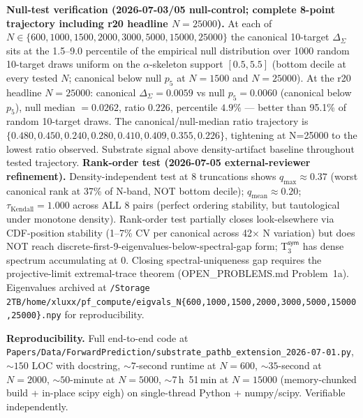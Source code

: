 \begin{level2}
\textbf{Null-test verification (2026-07-03/05 null-control; complete 8-point trajectory including r20 headline $N = 25000$).} At each of $N \in \{600, 1000, 1500, 2000, 3000, 5000, 15000, 25000\}$ the canonical 10-target $\Delta_{\Sigma}$ sits at the 1.5--9.0 percentile of the empirical null distribution over 1000 random 10-target draws uniform on the $\alpha$-skeleton support $[0.5, 5.5]$ (bottom decile at every tested $N$; canonical below null $p_5$ at $N = 1500$ and $N = 25000$). At the r20 headline $N = 25000$: canonical $\Delta_{\Sigma} = 0.0059$ vs null $p_5 = 0.0060$ (canonical below $p_5$), null median $= 0.0262$, ratio $0.226$, percentile $4.9\%$ --- better than 95.1\% of random 10-target draws. The canonical/null-median ratio trajectory is $\{0.480, 0.450, 0.240, 0.280, 0.410, 0.409, 0.355, 0.226\}$, tightening at N=25000 to the lowest ratio observed. Substrate signal above density-artifact baseline throughout tested trajectory. \textbf{Rank-order test (2026-07-05 external-reviewer refinement).} Density-independent test at 8 truncations shows $q_{\max} \approx 0.37$ (worst canonical rank at 37\% of N-band, NOT bottom decile); $q_{\text{mean}} \approx 0.20$; $\tau_{\text{Kendall}} = 1.000$ across ALL 8 pairs (perfect ordering stability, but tautological under monotone density). Rank-order test partially closes look-elsewhere via CDF-position stability (1--7\% CV per canonical across 42$\times$ N variation) but does NOT reach discrete-first-9-eigenvalues-below-spectral-gap form; T$_3^{\textsf{sym}}$ has dense spectrum accumulating at 0. Closing spectral-uniqueness gap requires the projective-limit extremal-trace theorem (OPEN\_PROBLEMS.md Problem~1a). Eigenvalues archived at \texttt{/Storage 2TB/home/xluxx/pf\_compute/eigvals\_N\{600,1000,1500,2000,3000,5000,15000,25000\}.npy} for reproducibility.

\textbf{Reproducibility.} Full end-to-end code at \texttt{Papers/Data/ForwardPrediction/substrate\_pathb\_extension\_2026-07-01.py}, $\sim 150$ LOC with docstring, $\sim 7$-second runtime at $N = 600$, $\sim 35$-second at $N = 2000$, $\sim 50$-minute at $N = 5000$, $\sim$7\,h~51\,min at $N = 15000$ (memory-chunked build + in-place scipy eigh) on single-thread Python + numpy/scipy. Verifiable independently.


\end{level2}
